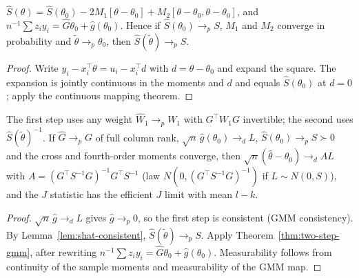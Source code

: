 \begin{lemma}
\label{lem:shat-consistent}
\leanok
{}
$\hat S(\theta) = \hat S(\theta_0) - 2M_1[\theta - \theta_0] + M_2[\theta - \theta_0,\theta - \theta_0]$, and
$n^{-1}\sum z_iy_i = \hat G\theta_0 + \hat g(\theta_0)$. Hence if $\hat S(\theta_0)\to_pS$, $M_1$ and $M_2$ converge in
probability and $\tilde\theta\to_p\theta_0$, then $\hat S(\tilde\theta)\to_pS$.
\end{lemma}
\begin{proof}
\leanok
Write $y_i - x_i^\top\theta = u_i - x_i^\top d$ with $d = \theta - \theta_0$ and expand the square. The expansion is
jointly continuous in the moments and $d$ and equals $\hat S(\theta_0)$ at $d = 0$; apply the continuous mapping theorem.
\end{proof}

\begin{theorem}
\label{thm:feasible-gmm}
\leanok
{}
The first step uses any weight $\hat W_1\to_pW_1$ with $G^\top W_1G$ invertible; the second uses $\hat S(\tilde\theta)^{-1}$.
If $\hat G\to_pG$ of full column rank, $\sqrt n\,\hat g(\theta_0)\to_dL$, $\hat S(\theta_0)\to_pS\succ0$ and the cross and
fourth-order moments converge, then $\sqrt n(\hat\theta - \theta_0)\to_d AL$ with $A = (G^\top S^{-1}G)^{-1}G^\top S^{-1}$
(law $N(0,(G^\top S^{-1}G)^{-1})$ if $L\sim N(0,S)$), and the $J$ statistic has the efficient $J$ limit with mean $l-k$.
\end{theorem}
\begin{proof}
\leanok
$\sqrt n\,\hat g\to_d L$ gives $\hat g\to_p0$, so the first step is consistent (GMM consistency). By
Lemma~\ref{lem:shat-consistent}, $\hat S(\tilde\theta)\to_pS$. Apply Theorem~\ref{thm:two-step-gmm}, after rewriting
$n^{-1}\sum z_iy_i = \hat G\theta_0 + \hat g(\theta_0)$. Measurability follows from continuity of the sample moments and
measurability of the GMM map.
\end{proof}

